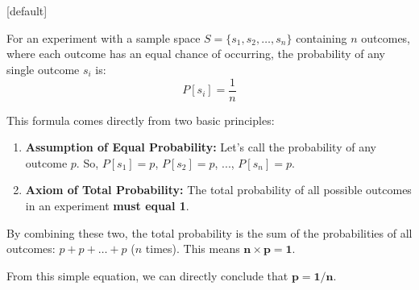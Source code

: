 \begin{frame}[t]
\frametitle{\ }
[default]
\vspace{-7mm}
\footnotesize
  \begin{Teorema}
    For an experiment with a sample space $S = \{s_1, s_2, \dots, s_n\}$ containing $n$ outcomes, where each outcome has an equal chance of occurring, the probability of any single outcome $s_i$ is:
    \[
      P[s_i] = \frac{1}{n}
    \]
  \end{Teorema}
  \vspace{-1mm}
  \vspace{-3mm}
  \begin{alertblock}{}
    This formula comes directly from two basic principles:
    \begin{enumerate}
        \item \textbf{Assumption of Equal Probability:} Let's call the probability of any outcome $p$. So, $P[s_1] = p$, $P[s_2] = p$, ..., $P[s_n] = p$.
        \item \textbf{Axiom of Total Probability:} The total probability of all possible outcomes in an experiment \textbf{must equal 1}.
    \end{enumerate}
    By combining these two, the total probability is the sum of the probabilities of all outcomes: $p + p + \dots + p$ ($n$ times). This means $\mathbf{n \times p = 1}$.
    
    From this simple equation, we can directly conclude that $\mathbf{p = 1/n}$.
  \end{alertblock}
\end{frame}

